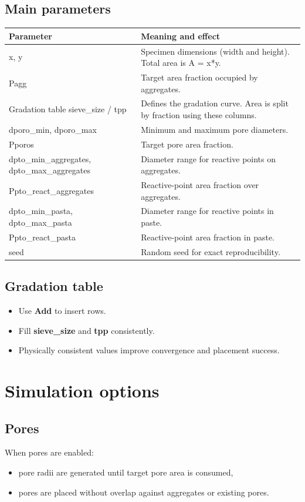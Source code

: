 \documentclass[11pt,a4paper]{article}
\begin{document}
\subsection{Main parameters}
\begin{longtable}{p{} p{}}
\toprule
\textbf{Parameter} & \textbf{Meaning and effect} \\
\midrule
x, y & Specimen dimensions (width and height). Total area is A = x*y. \\
Pagg & Target area fraction occupied by aggregates. \\
Gradation table sieve\_size / tpp & Defines the gradation curve. Area is split by fraction using these columns. \\
dporo\_min, dporo\_max & Minimum and maximum pore diameters. \\
Pporos & Target pore area fraction. \\
dpto\_min\_aggregates, dpto\_max\_aggregates & Diameter range for reactive points on aggregates. \\
Ppto\_react\_aggregates & Reactive-point area fraction over aggregates. \\
dpto\_min\_pasta, dpto\_max\_pasta & Diameter range for reactive points in paste. \\
Ppto\_react\_pasta & Reactive-point area fraction in paste. \\
seed & Random seed for exact reproducibility. \\
\bottomrule
\end{longtable}

\subsection{Gradation table}
\begin{itemize}[leftmargin=1.5em]
  \item Use \textbf{Add} to insert rows.
  \item Fill \textbf{sieve\_size} and \textbf{tpp} consistently.
  \item Physically consistent values improve convergence and placement success.
\end{itemize}

\section{Simulation options}
\subsection{Pores}
When pores are enabled:
\begin{itemize}[leftmargin=1.5em]
  \item pore radii are generated until target pore area is consumed,
  \item pores are placed without overlap against aggregates or existing pores.
\end{itemize}
\end{document}

